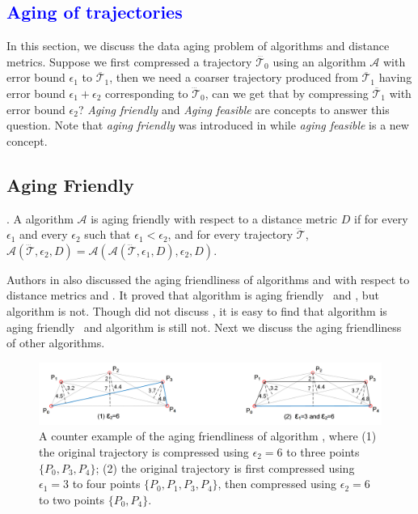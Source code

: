 
\textcolor{blue}{\section{Aging of trajectories}}

In this section, we discuss the data aging problem of \lsa algorithms and distance metrics.
%
Suppose we first compressed a trajectory $\dddot{\mathcal{T}_0}$ using an \lsa algorithm $\mathcal{A}$ with error bound $\epsilon_1$ to $\overline{\mathcal{T}}_1$, then we need a coarser trajectory produced from $\overline{\mathcal{T}}_1$  having error bound $\epsilon_1 + \epsilon_2$ corresponding to $\dddot{\mathcal{T}}_0$, can we get that by compressing $\overline{\mathcal{T}}_1$ with error bound $\epsilon_2$?  \emph{Aging friendly \cite{Cao:Spatio}} and \emph{Aging feasible} are concepts to answer this question. Note that \emph{aging friendly} was introduced in \cite{Cao:Spatio} while \emph{aging feasible} is a new concept.

\subsection{Aging Friendly}
	
. {A \lsa algorithm $\mathcal{A}$ is aging friendly with respect to a distance metric $D$ if for every $\epsilon_1$ and every $\epsilon_2$ such that $\epsilon_1 < \epsilon_2$, and for every trajectory $\dddot{\mathcal{T}}$, $\mathcal{A}(\dddot{\mathcal{T}}, \epsilon_2, D)= \mathcal{A}(\mathcal{A}(\dddot{\mathcal{T}}, \epsilon_1, D), \epsilon_2, D)$.}

	
Authors in \cite{Cao:Spatio} also discussed the aging friendliness of algorithms \opt and \dpa with respect to distance metrics \ped and \sed. It proved that algorithm \dpa is aging friendly \wrt~\ped and \sed, but algorithm \opt is not. 
Though \cite{Cao:Spatio} did not discuss \dad, it is easy to find that algorithm \dpa is aging friendly \wrt~\dad and algorithm \opt is still not. Next we discuss the aging friendliness of other algorithms.


\begin{figure}[tb!]
	\centering
	\includegraphics[scale=0.66]{Figures/Fig-aging-pavlidis.png}

	\caption{\small A counter example of the aging friendliness of algorithm \tpa, where (1) the original trajectory is compressed using $\epsilon_2=6$ to three points $\{P_0, P_3, P_4\}$; (2) the original trajectory is first compressed using $\epsilon_1=3$ to four points $\{P_0, P_1, P_3, P_4\}$, then compressed using $\epsilon_2=6$ to two points $\{P_0, P_4\}$. }
	\vspace{-2ex}
	\label{fig:aging-pavlidis}
\end{figure}


